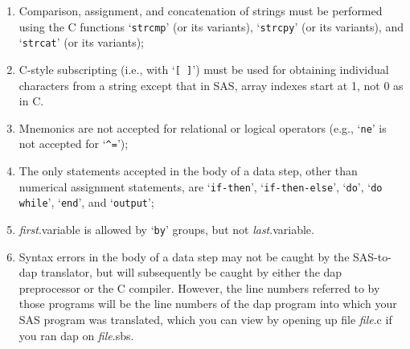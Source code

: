 \documentclass{book}
\newcommand\Texinfocommandstyletextvar[1]{{\normalfont{}\textsl{#1}}}%
\renewcommand{\_}{\Texinfounderscore\discretionary{}{}{}}
\begin{document}
\begin{enumerate}[start=1]
\item Comparison, assignment, and concatenation of strings must be performed
using the C functions `\texttt{strcmp}' (or its variants),
`\texttt{strcpy}' (or its variants), and `\texttt{strcat}' (or its variants);

\item C-style subscripting (i.e., with `\texttt{[ ]}') must be used for obtaining
individual characters from a string except that in SAS, array indexes start at
1, not 0 as in C.

\item Mnemonics are not accepted for relational or logical operators (e.g., `\texttt{ne}'
is not accepted for `\texttt{\^{}=}');

\item The only statements accepted in the body of a data step, other than numerical
assignment statements, are `\texttt{if-then}', `\texttt{if-then-else}',
`\texttt{do}', `\texttt{do while}', `\texttt{end}', and `\texttt{output}';

\item \Texinfocommandstyletextvar{first}.variable is allowed by `\texttt{by}' groups, but not \Texinfocommandstyletextvar{last}.variable.

\item Syntax errors in the body of a data step may not be caught by the SAS-to-dap
translator, but will subsequently be caught by either the dap preprocessor
or the C compiler. However, the line numbers referred to by those programs will
be the line numbers of the dap program into which your SAS program was translated,
which you can view by opening up file \Texinfocommandstyletextvar{file}.c if you ran dap on \Texinfocommandstyletextvar{file}.sbs.

\end{enumerate}

%
\end{document}
